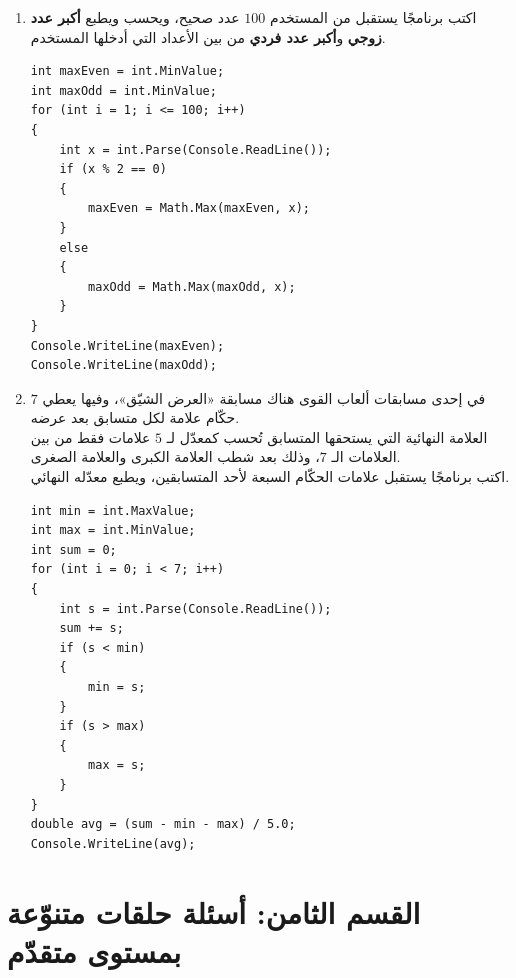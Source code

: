 \documentclass[14pt]{extarticle}
\begin{document}
\begin{enumerate}[resume, itemsep=1em]
\item اكتب برنامجًا يستقبل من المستخدم $100$ عدد صحيح، ويحسب ويطبع \textbf{أكبر عدد زوجي} و\textbf{أكبر عدد فردي} من بين الأعداد التي أدخلها المستخدم.
\ifwithsols
\begin{boxSolution}
\begin{english}
\begin{verbatim}
int maxEven = int.MinValue;
int maxOdd = int.MinValue;
for (int i = 1; i <= 100; i++)
{
    int x = int.Parse(Console.ReadLine());
    if (x % 2 == 0)
    {
        maxEven = Math.Max(maxEven, x);
    }
    else
    {
        maxOdd = Math.Max(maxOdd, x);
    }
}
Console.WriteLine(maxEven);
Console.WriteLine(maxOdd);
\end{verbatim}
\end{english}
\end{boxSolution}
\fi
\filbreak

\item في إحدى مسابقات ألعاب القوى هناك مسابقة «العرض الشيّق»، وفيها يعطي $7$ حكّام علامة لكل متسابق بعد عرضه. \\
العلامة النهائية التي يستحقها المتسابق تُحسب كمعدّل لـ $5$ علامات فقط من بين العلامات الـ $7$، وذلك بعد شطب العلامة الكبرى والعلامة الصغرى. \\
اكتب برنامجًا يستقبل علامات الحكّام السبعة لأحد المتسابقين، ويطبع معدّله النهائي.
\ifwithsols
\begin{boxSolution}
\begin{english}
\begin{verbatim}
int min = int.MaxValue;
int max = int.MinValue;
int sum = 0;
for (int i = 0; i < 7; i++)
{
    int s = int.Parse(Console.ReadLine());
    sum += s;
    if (s < min)
    {
        min = s;
    }
    if (s > max)
    {
        max = s;
    }
}
double avg = (sum - min - max) / 5.0;
Console.WriteLine(avg);
\end{verbatim}
\end{english}
\end{boxSolution}
\fi
\filbreak

\end{enumerate}

\clearpage
\section*{القسم الثامن: أسئلة حلقات متنوّعة بمستوى متقدّم}
\end{document}
